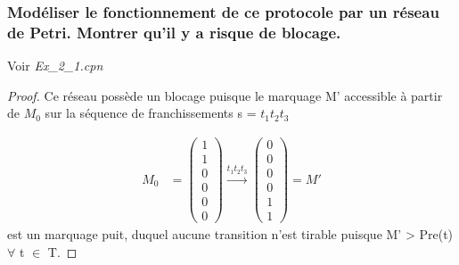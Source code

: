 \documentclass[french]{article}
\begin{document}
\subsubsection{Modéliser le fonctionnement de ce protocole par un réseau de Petri. Montrer qu’il y a risque de
  blocage.}
Voir \textit{Ex\_2\_1.cpn}
\begin{proof}
  Ce réseau possède un blocage puisque le marquage M' accessible à partir de $M_0$ sur la séquence de franchissements s = $t_1
  t_2 t_3$

  \begin{align*}
    M_0 &= \begin{pmatrix}
      1 \\
      1 \\
      0 \\
      0 \\
      0 \\
      0
    \end{pmatrix} \xrightarrow{t_1 t_2 t_3}
    \begin{pmatrix}
      0 \\
      0 \\
      0 \\
      0 \\
      1 \\
      1
    \end{pmatrix} = M'
  \end{align*}
  est un marquage puit, duquel aucune transition n'est tirable puisque M' > Pre(t) $\forall$ t $\in$ T.
\end{proof}
\end{document}
